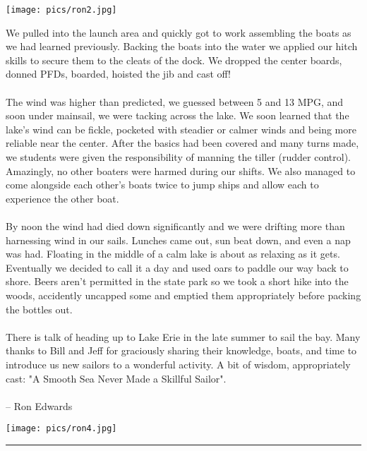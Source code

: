 \documentclass[10pt,a4paper]{article}
\newenvironment{Figure}
  {\par\medskip\noindent\minipage{\linewidth}}
  {\endminipage\par\medskip}
\begin{document}
\begin{multicols}{2}
\begin{Figure}
 \centering
 \texttt{[image: pics/ron2.jpg]}
\end{Figure}
We pulled into the launch area and quickly got to work assembling the boats as we had learned previously.  Backing the boats into the water we applied our hitch skills to secure them to the cleats of the dock.  We dropped the center boards, donned PFDs, boarded, hoisted the jib and cast off!
\\
\\
The wind was higher than predicted, we guessed between 5 and 13 MPG, and soon under mainsail, we were tacking across the lake.  We soon learned that the lake's wind can be fickle, pocketed with steadier or calmer winds and being more reliable near the center.  After the basics had been covered and many turns made, we students were given the responsibility of manning the tiller (rudder control).   Amazingly, no other boaters were harmed during our shifts.  We also managed to come alongside each other's boats twice to jump ships and allow each to experience the other boat.
\\
\\
By noon the wind had died down significantly and we were drifting more than harnessing wind in our sails.  Lunches came out, sun beat down, and even a nap was had.  Floating in the middle of a calm lake is about as relaxing as it gets.  Eventually we decided to call it a day and used oars to paddle our way back to shore.  Beers aren't permitted in the state park so we took a short hike into the woods, accidently uncapped some and emptied them appropriately before packing the bottles out.
\\
\\
There is talk of heading up to Lake Erie in the late summer to sail the bay.  Many thanks to Bill and Jeff for graciously sharing their knowledge, boats, and time to introduce us new sailors to a wonderful activity.
A bit of wisdom, appropriately cast: "A Smooth Sea Never Made a Skillful Sailor".
\\
\\
-- Ron Edwards

\begin{Figure}
 \centering
 \texttt{[image: pics/ron4.jpg]}
\end{Figure}

\hrule

\clearpage
\pagebreak


\end{multicols}
\end{document}

